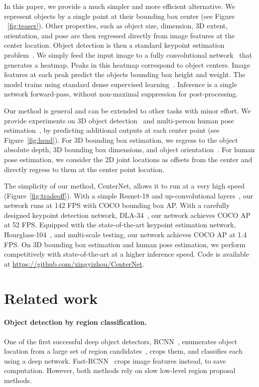 \documentclass[10pt,twocolumn,letterpaper]{article}
\begin{document}
In this paper, we provide a much simpler and more efficient alternative.
We represent objects by a single point at their bounding box center (see Figure ~\ref{fig:teaser}).
Other properties, such as object size, dimension, 3D extent, orientation, and pose are then regressed directly from image features at the center location.
Object detection is then a standard keypoint estimation problem~\cite{cao2018openpose,newell2017associative,zhou2018starmap}.
We simply feed the input image to a fully convolutional network~\cite{long2015fully,newell2016stacked} that generates a heatmap.
Peaks in this heatmap correspond to object centers.
Image features at each peak predict the objects bounding box height and weight.
The model trains using standard dense supervised learning~\cite{newell2017associative,zhou2018starmap}.
Inference is a single network forward-pass, without non-maximal suppression for post-processing.

Our method is general and can be extended to other tasks with minor effort.
We provide experiments on 3D object detection~\cite{Geiger2012CVPR} and multi-person human pose estimation~\cite{cao2017realtime}, by predicting additional outputs at each center point (see Figure~\ref{fig:head}).
For 3D bounding box estimation, we regress to the object absolute depth, 3D bounding box dimensions, and object orientation~\cite{mousavian20173d}.
For human pose estimation, we consider the 2D joint locations as offsets from the center and directly regress to them at the center point location.

The simplicity of our method, CenterNet, allows it to run at a very high speed (Figure~\ref{fig:tradeoff}).
With a simple Resnet-18 and up-convolutional layers~\cite{xiao2018simple}, our network runs at 142 FPS with  COCO bounding box AP. 
With a carefully designed keypoint detection network, DLA-34~\cite{yu2018deep}, our network achieves  COCO AP at 52 FPS.
Equipped with the state-of-the-art keypoint estimation network, Hourglass-104~\cite{Law_2018_ECCV,newell2016stacked}, and multi-scale testing, our network achieves  COCO AP at 1.4 FPS.
On 3D bounding box estimation and human pose estimation, we perform competitively with state-of-the-art at a higher inference speed.
Code is available at \url{https://github.com/xingyizhou/CenterNet}.

\section{Related work}

\paragraph{Object detection by region classification.}
One of the first successful deep object detectors, RCNN~\cite{girshick2014rich}, enumerates object location from a large set of region candidates~\cite{uijlings2013selective}, crops them, and classifies each using a deep network.
Fast-RCNN~\cite{girshick2015fast} crops image features instead, to save computation. 
However, both methods rely on slow low-level region proposal methods.
\end{document}
